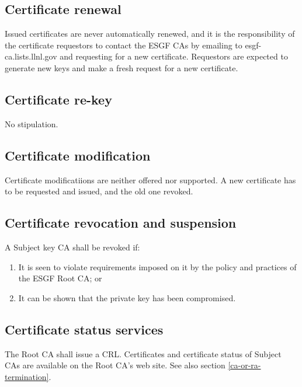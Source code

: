 \subsection{Certificate renewal}\label{certificate-renewal}

Issued certificates are never automatically renewed, and it is the responsibility of the certificate requestors to contact the ESGF CAs by emailing to esgf-ca.lists.llnl.gov and requesting for a new certificate. Requestors are expected to generate new keys and make a fresh request for a new certificate.

\subsection{Certificate re-key}
No stipulation.

\subsection{Certificate modification}
Certificate modificatiions are neither offered nor supported. A new certificate has to be requested and issued, and the old one revoked.

\subsection{Certificate revocation and suspension}\label{certificate-revocation-and-suspension}

A Subject key CA shall be revoked if:

\begin{enumerate}
\item
  
  It is seen to violate requirements imposed on it by the policy and
  practices of the ESGF Root CA; or
  
\item
  
  It can be shown that the private key has been compromised.
  
\end{enumerate}

\subsection{Certificate status services}\label{certificate-status-services}

The Root CA shall issue a CRL. Certificates and certificate status of
Subject CAs are available on the Root CA's web site. See also section
\ref{ca-or-ra-termination}.

